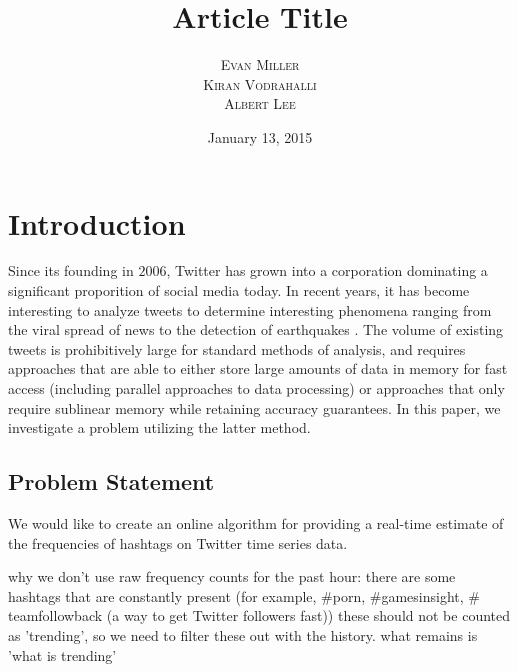 \documentclass[twoside]{article}
\title{\vspace{-15mm}\fontsize{24pt}{10pt}\selectfont\textbf{Article Title}} %
\author{
\large
\textsc{Evan Miller}\\[2mm] 
\textsc{Kiran Vodrahalli}\\[2mm]
\textsc{Albert Lee}\\[2mm]
\vspace{-5mm}
}
\date{January 13, 2015}
\newcommand{\cc}[1]
 {\textbf{\cite{#1}}}
\begin{document}
\maketitle %


\begin{abstract}

\noindent \lipsum[1] %

\end{abstract}



\section{Introduction} \label{sec:Intro}

Since its founding in $2006$, Twitter has grown into a corporation dominating a significant
proporition of social media today. In recent years, it has become interesting to analyze tweets
to determine interesting phenomena ranging from the viral spread of news to the detection of earthquakes \cc{Burks:2014}. The volume of existing tweets is prohibitively large for standard methods of analysis, and requires approaches that are able to either store large amounts of data in memory for fast access (including parallel approaches to data processing) or approaches that only require sublinear memory while retaining accuracy guarantees. In this paper, we investigate a problem utilizing the latter method. 

\subsection{Problem Statement} 

We would like to create an online algorithm for providing a real-time estimate of the frequencies of hashtags on Twitter time series data.

why we don't use raw frequency counts for the past hour:
there are some hashtags that are constantly present (for example, $\#$porn, $\#$gamesinsight, $\#$teamfollowback (a way to get Twitter followers fast))
these should not be counted as 'trending', so we need to filter these out
with the history. what remains is 'what is trending'
\end{document}
